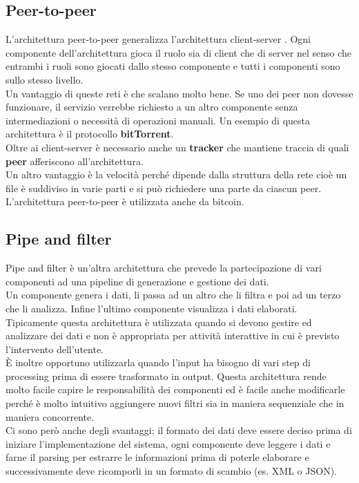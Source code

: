 \subsection{Peer-to-peer}
L'architettura peer-to-peer generalizza l'architettura client-server .
Ogni componente dell'architettura gioca il ruolo sia di client che di server nel senso che entrambi i ruoli sono giocati dallo stesso componente e tutti i componenti sono sullo stesso livello.\\
Un vantaggio di queste reti è che scalano molto bene.
Se uno dei peer non dovesse funzionare, il servizio verrebbe richiesto a un altro componente senza intermediazioni o necessità di operazioni manuali.
Un esempio di questa architettura è il protocollo \textbf{bitTorrent}.\\
Oltre ai client-server è necessario anche un \textbf{tracker} che mantiene traccia di quali \textbf{peer} afferiscono all'architettura.\\
Un altro vantaggio è la velocità perché dipende dalla struttura della rete cioè un file è suddiviso in varie parti e si può richiedere una parte da ciascun peer.
L'architettura peer-to-peer è utilizzata anche da bitcoin.

\subsection{Pipe and filter}
Pipe and filter è un'altra architettura che prevede la partecipazione di vari componenti ad una pipeline di generazione e gestione dei dati.\\
Un componente genera i dati, li passa ad un altro che li filtra e poi ad un terzo che li analizza.
Infine l'ultimo componente visualizza i dati elaborati.\\
Tipicamente questa architettura è utilizzata quando si devono gestire ed analizzare dei dati e non è appropriata per attività interattive in cui è previsto l'intervento dell'utente.\\
È inoltre opportuno utilizzarla quando l'input ha bisogno di vari step di processing prima di essere trasformato in output.
Questa architettura rende molto facile capire le responsabilità dei componenti ed è facile anche modificarle perché è molto intuitivo aggiungere nuovi filtri sia in maniera sequenziale che in maniera concorrente.\\
Ci sono però anche degli svantaggi; il formato dei dati deve essere deciso prima di iniziare l'implementazione del sistema, ogni componente deve leggere i dati e farne il parsing per estrarre le informazioni prima di poterle elaborare e successivamente deve ricomporli in un formato di scambio (es. \acrfull{XML} o \acrfull{JSON}).
